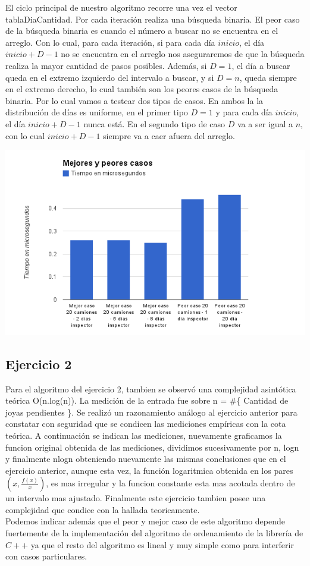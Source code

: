 \vspace{2mm}

El ciclo principal de nuestro algoritmo recorre una vez el vector tablaDiaCantidad. Por cada iteraci\'on realiza una b\'usqueda binaria. El peor caso de la b\'usqueda binaria es cuando el n\'umero a buscar no se encuentra en el arreglo. Con lo cual, para cada iteraci\'on, si para cada d\'ia $inicio$, el d\'ia $inicio + D - 1$ no se encuentra en el arreglo nos aseguraremos de que la b\'usqueda realiza la mayor cantidad de pasos posibles. Adem\'as, si $D=1$, el d\'ia a buscar queda en el extremo izquierdo del intervalo a buscar, y si $D=n$, queda siempre en el extremo derecho, lo cual tambi\'en son los peores casos de la b\'usqueda binaria. Por lo cual vamos a testear dos tipos de casos. En ambos la la distribuci\'on de d\'ias es uniforme, en el primer tipo $D=1$ y para cada d\'ia $inicio$, el d\'ia $inicio + D - 1$ nunca est\'a. En el segundo tipo de caso $D$ va a ser igual a $n$, con lo cual $inicio + D - 1$ siempre va a caer afuera del arreglo.

\includegraphics[scale=0.750]{images/ej1_mejor_peor.png}

\subsection{Ejercicio 2}
Para el algoritmo del ejercicio 2, tambien se observ\'o una complejidad asint\'otica te\'orica O(n.log(n)). La medici\'on de la entrada fue sobre n = \#\{ Cantidad de joyas pendientes \}. Se realiz\'o un razonamiento an\'alogo al ejercicio anterior para constatar con seguridad que se condicen las mediciones emp\'iricas con la cota te\'orica. A continuaci\'on se indican las mediciones, nuevamente graficamos la funcion original obtenida de las mediciones, dividimos sucesivamente por n, logn y finalmente nlogn obteniendo nuevamente las mismas conclusiones que en el ejercicio anterior, aunque esta vez, la funci\'on logaritmica obtenida en los pares $(x, \frac{f(x)}{x})$, es mas irregular y la funcion constante esta mas acotada dentro de un intervalo mas ajustado. Finalmente este ejercicio tambien posee una complejidad que condice con la hallada teoricamente.\\
Podemos indicar adem\'as que el peor y mejor caso de este algoritmo depende fuertemente de la implementaci\'on del algoritmo de ordenamiento de la librer\'ia de $C++$ ya que el resto del algoritmo es lineal y muy simple como para interferir con casos particulares.


